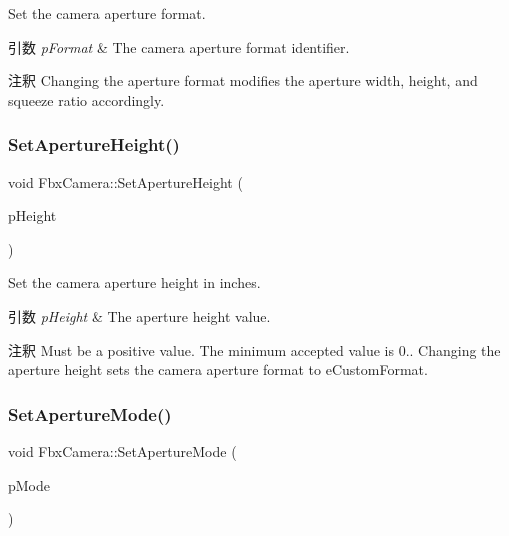 Set the camera aperture format. 
\begin{DoxyParams}{引数}
{\em p\+Format} & The camera aperture format identifier. \\
\hline
\end{DoxyParams}
\begin{DoxyRemark}{注釈}
Changing the aperture format modifies the aperture width, height, and squeeze ratio accordingly. 
\end{DoxyRemark}
\mbox{\label{class_fbx_camera_a02bdb12abf27b4ccc0c4554818bdbf8f}} 
\subsubsection{\texorpdfstring{Set\+Aperture\+Height()}{SetApertureHeight()}}
{\footnotesize\ttfamily void Fbx\+Camera\+::\+Set\+Aperture\+Height (\begin{DoxyParamCaption}\item[{double}]{p\+Height }\end{DoxyParamCaption})}

Set the camera aperture height in inches. 
\begin{DoxyParams}{引数}
{\em p\+Height} & The aperture height value. \\
\hline
\end{DoxyParams}
\begin{DoxyRemark}{注釈}
Must be a positive value. The minimum accepted value is 0.. Changing the aperture height sets the camera aperture format to e\+Custom\+Format. 
\end{DoxyRemark}
\mbox{\label{class_fbx_camera_a479485801a0795d337d73e25ef8c4477}} 
\subsubsection{\texorpdfstring{Set\+Aperture\+Mode()}{SetApertureMode()}}
{\footnotesize\ttfamily void Fbx\+Camera\+::\+Set\+Aperture\+Mode (\begin{DoxyParamCaption}\item[{\hyperlink{class_fbx_camera_addeea6fc943ce5f087dbc54c142f890e}{E\+Aperture\+Mode}}]{p\+Mode }\end{DoxyParamCaption})}


